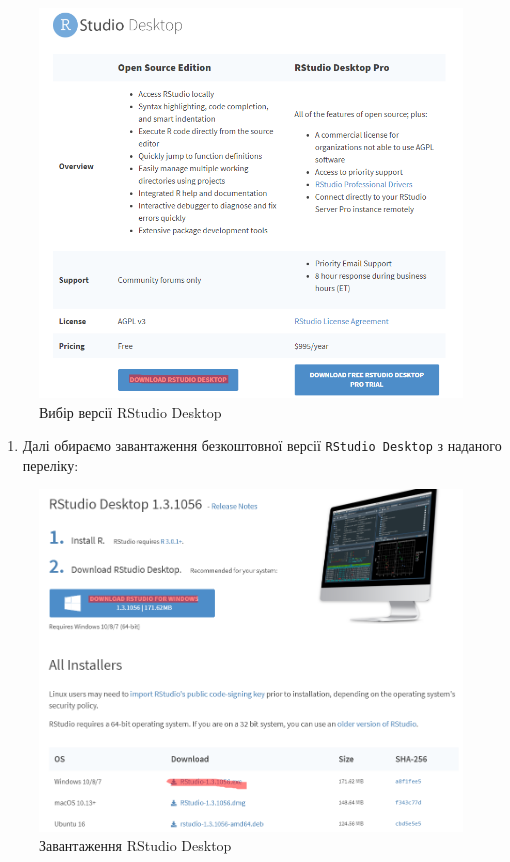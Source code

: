 \documentclass[
]{book}
\providecommand{\tightlist}{%
  \setlength{\itemsep}{0pt}\setlength{\parskip}{0pt}}
\begin{document}
\begin{figure}
\includegraphics[width=11.4in]{images/chapter1/rstudio_1} \caption{Вибір версії RStudio Desktop}\label{fig:unnamed-chunk-13}
\end{figure}

\begin{enumerate}
\def\labelenumi{\arabic{enumi}.}
\setcounter{enumi}{2}
\tightlist
\item
  Далі обираємо завантаження безкоштовної версії \texttt{RStudio\ Desktop} з наданого переліку:
\end{enumerate}

\begin{figure}
\includegraphics[width=13.38in]{images/chapter1/rstudio_2} \caption{Завантаження RStudio Desktop}\label{fig:unnamed-chunk-14}
\end{figure}
\end{document}
